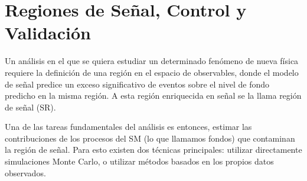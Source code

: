 





\section{Regiones de Señal, Control y Validación}
\label{sec:regiones}

Un análisis en el que se quiera estudiar un determinado fenómeno de nueva física
requiere la definición de una región en el espacio de observables, donde el modelo de señal
predice un exceso significativo de eventos sobre el nivel de fondo predicho en
la misma región. A esta región enriquecida en señal se la llama región de señal
(SR).

Una de las tareas fundamentales del análisis es entonces, estimar las
contribuciones de los procesos del SM (lo que llamamos fondos) que contaminan la región de
señal.
Para esto existen dos técnicas principales: utilizar directamente simulaciones Monte Carlo,
o utilizar métodos basados en los propios datos observados.



